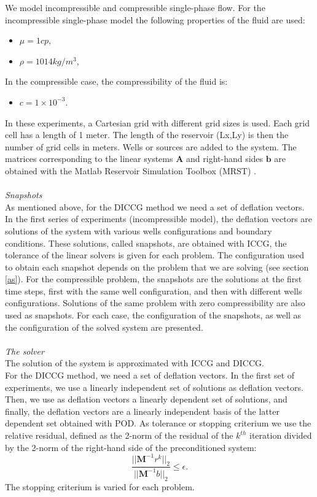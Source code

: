\documentclass[12pt]{article}
\begin{document}
We model incompressible and compressible single-phase flow.
For the incompressible single-phase model the following properties of the fluid are used:
\begin{itemize}
 \item $\mu = 1 cp$,
 \item $\rho = 1014 kg/m^3$,
\end{itemize}
In the compressible case, the compressibility of the fluid is:
\begin{itemize}
 \item $c= 1 \times 10^{-3}$.
\end{itemize}
In these experiments, a Cartesian grid with different grid sizes is used. Each grid cell has a length of 1 meter. The length of the reservoir (Lx,Ly) is then the number of grid cells in meters. Wells or sources are added to the system. 
The matrices corresponding to the linear systems $\mathbf{A}$ and right-hand sides $\mathbf{b}$ are obtained with the Matlab Reservoir Simulation Toolbox (MRST) \cite{Lie13}.
\\ \\
\emph{Snapshots}\\
As mentioned above, for the DICCG method we need a set of deflation vectors. In the first series of
experiments (incompressible model), the deflation vectors are 
solutions of the system with various wells configurations and boundary conditions. These solutions, 
called snapshots, are obtained with ICCG, the tolerance of the linear solvers is given for each problem. 
The configuration used to obtain each snapshot depends on the problem that we are solving (see section \ref{as}). 
For the compressible problem, the snapshots are the solutions at the first time steps, first with the same well configuration, and then with different wells configurations. Solutions of the same problem with zero compressibility are also used as snapshots.
For each case,
the configuration of the snapshots, as well as the configuration of the solved system are presented.
\\ \\
\emph{The solver}\\
The solution of the system is approximated with ICCG and DICCG.\\
For the DICCG method, we need a set of deflation vectors. 
In the first set of experiments, we use a linearly independent set of solutions as deflation vectors. Then, we use as deflation vectors a linearly dependent set of solutions, and finally, the deflation vectors are a linearly independent basis of the latter dependent set obtained with POD.
As tolerance or stopping criterium we use the relative residual, defined as the 2-norm of the residual of the $k^{th}$ iteration divided by 
the 2-norm of the right-hand side of the preconditioned system: 
$$\frac{||\mathbf{M}^{-1}r^k||_2}{||\mathbf{M}^{-1}b||_2}\leq \epsilon.$$
The stopping criterium is varied for each problem. 
\newpage
\end{document}
